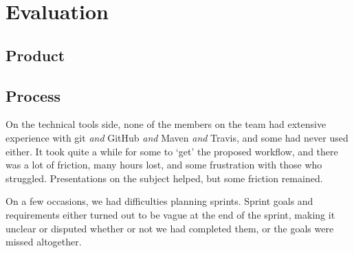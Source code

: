 \chapter{Evaluation}
\label{chap:Evaluation}

\section{Product}


\section{Process}

On the technical tools side, none of the members on the team had extensive experience with git \emph{and} GitHub \emph{and} Maven \emph{and} Travis, and some had never used either. It took quite a while for some to `get' the proposed workflow, and there was a lot of friction, many hours lost, and some frustration with those who struggled. Presentations on the subject helped, but some friction remained.

On a few occasions, we had difficulties planning sprints. Sprint goals and requirements either turned out to be vague at the end of the sprint, making it unclear or disputed whether or not we had completed them, or the goals were missed altogether.


